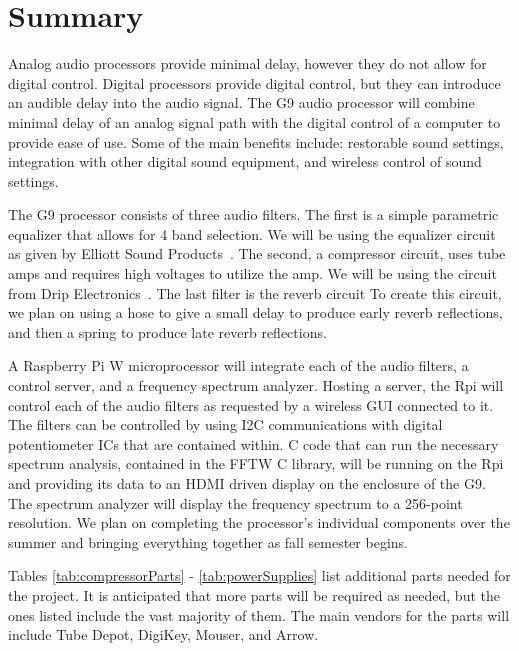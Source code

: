 \documentclass[journal]{IEEEtran}
\begin{document}
	
	
	\section{Summary}
	Analog audio processors provide minimal delay, however they do not allow for digital control.  Digital processors provide digital control, but they can introduce an audible delay into the audio signal.  The G9 audio processor will combine minimal delay of an analog signal path with the digital control of a computer to provide ease of use.  Some of the main benefits include: restorable sound settings, integration with other digital sound equipment, and wireless control of sound settings.
	
	The G9 processor consists of three audio filters. The first is a simple parametric equalizer that allows for 4 band selection.  We will be using the equalizer circuit as given by Elliott Sound Products~\cite{espEq}.  The second, a compressor circuit, uses tube amps and requires high voltages to utilize the amp.  We will be using the circuit from Drip Electronics~\cite{opto7}. The last filter is the reverb circuit  To create this circuit, we plan on using a hose to give a small delay to produce early reverb reflections, and then a spring to produce late reverb reflections.
	
	A Raspberry Pi W microprocessor will integrate each of the audio filters, a control server, and a frequency spectrum analyzer.  Hosting a server, the Rpi will control each of the audio filters as requested by a wireless GUI connected to it.  The filters can be controlled by using I2C communications with digital potentiometer ICs that are contained within.  C code that can run the necessary spectrum analysis, contained in the FFTW C library, will be running on the Rpi and providing its data to an HDMI driven display on the enclosure of the G9.  The spectrum analyzer will display the frequency spectrum to a 256-point resolution. We plan on completing the processor's individual components over the summer and bringing everything together as fall semester begins. 
	
	
	
	\appendix
	Tables \ref{tab:compressorParts} - \ref{tab:powerSupplies} list additional parts needed for the project. It is anticipated that more parts will be required as needed, but the ones listed include the vast majority of them. The main vendors for the parts will include Tube Depot, DigiKey, Mouser, and Arrow.
	
	
	
\end{document}
